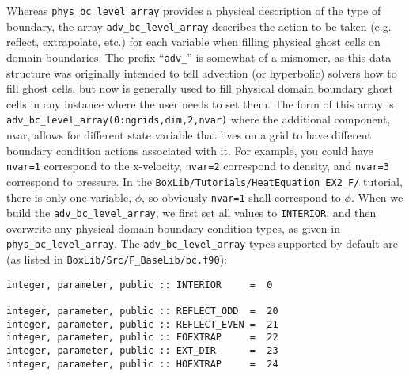 Whereas {\tt phys\_bc\_level\_array} provides a physical description of the type of boundary, the array
{\tt adv\_bc\_level\_array} describes the action to be taken (e.g. reflect, extrapolate, etc.) for each 
variable when filling physical ghost cells on domain boundaries.  The prefix ``{\tt adv\_}'' is somewhat
of a misnomer, as this data structure was originally intended to tell advection (or hyperbolic) solvers
how to fill ghost cells, but now is generally used to fill physical domain boundary ghost cells in any
instance where the user needs to set them.
The form of this array is {\tt adv\_bc\_level\_array(0:ngrids,dim,2,nvar)}
where the additional component, nvar, allows for different state variable that lives on a grid to have 
different boundary condition actions associated with it.  For example, you could have {\tt nvar=1}
correspond to the x-velocity, {\tt nvar=2} correspond to density, and {\tt nvar=3} correspond to pressure.
In the {\tt BoxLib/Tutorials/HeatEquation\_EX2\_F/} tutorial, there is only one variable, $\phi$, so
obviously {\tt nvar=1} shall correspond to $\phi$.  When we build the {\tt adv\_bc\_level\_array},
we first set all values to {\tt INTERIOR}, and then overwrite any physical domain boundary condition types,
as given in {\tt phys\_bc\_level\_array}.  The {\tt adv\_bc\_level\_array} types supported by default are
(as listed in {\tt BoxLib/Src/F\_BaseLib/bc.f90}):
\begin{lstlisting}[backgroundcolor=\color{light-green}]
integer, parameter, public :: INTERIOR     =  0

integer, parameter, public :: REFLECT_ODD  =  20
integer, parameter, public :: REFLECT_EVEN =  21
integer, parameter, public :: FOEXTRAP     =  22
integer, parameter, public :: EXT_DIR      =  23
integer, parameter, public :: HOEXTRAP     =  24
\end{lstlisting}

